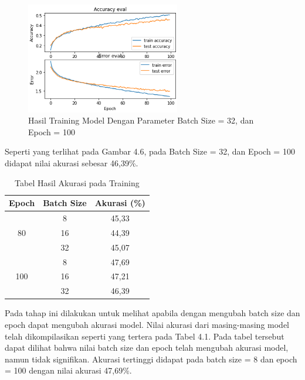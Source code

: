 \begin{figure}[H]
	\centering
	
	\includegraphics[width=0.6\textwidth]{gambar/b32_e100}
	
	\caption{Hasil Training Model Dengan Parameter Batch Size = 32, dan Epoch = 100}
	\label{fig:b32_e100}
\end{figure}

Seperti yang terlihat pada Gambar 4.6, pada Batch Size = 32, dan Epoch = 100 didapat nilai akurasi sebesar 46,39\%.

\begin{longtable}[c]{|c|c|c|}
	\caption{Tabel Hasil Akurasi pada Training}
	\label{tab:my-table}\\
	\hline
	\textbf{Epoch}       & \textbf{Batch Size} & \textbf{Akurasi (\%)} \\ \hline
	\endfirsthead
	\endhead
	\multirow{3}{*}{80}  & 8                   & 45,33                 \\ \cline{2-3} 
	& 16                  & 44,39                 \\ \cline{2-3} 
	& 32                  & 45,07                 \\ \hline
	\multirow{3}{*}{100} & 8                   & 47,69                 \\ \cline{2-3} 
	& 16                  & 47,21                 \\ \cline{2-3} 
	& 32                  & 46,39                 \\ \hline
\end{longtable}

Pada tahap ini dilakukan untuk melihat apabila dengan mengubah batch size dan epoch dapat mengubah akurasi model. Nilai akurasi dari masing-masing model telah dikompilasikan seperti yang tertera pada Tabel 4.1. Pada tabel tersebut dapat dilihat bahwa nilai batch size dan epoch telah mengubah akurasi model, namun tidak signifikan. Akurasi tertinggi didapat pada batch size = 8 dan epoch = 100 dengan nilai akurasi 47,69\%.

